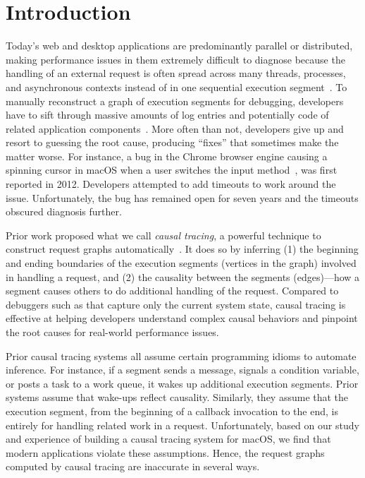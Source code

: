 \section{Introduction} \label{sec:intro}

Today's web and desktop applications are predominantly parallel or
distributed, making performance issues in them extremely difficult to
diagnose because the handling of an external request is often spread across
many threads, processes, and asynchronous contexts instead of in one
sequential execution segment~\cite{harter2012file}. To manually reconstruct
a graph of execution segments for debugging, developers have to sift
through massive amounts of log entries and potentially code of related
application components~\cite{chen2002pinpoint, zhao2016non, xu2009detecting,
nagaraj2012structured, yuan2012conservative}. More often than not, developers
give up and resort to guessing the root cause, producing ``fixes'' that
sometimes make the matter worse. For instance, a bug in the Chrome browser
engine causing a spinning cursor in macOS when a user switches the input
method~\cite{chromiumbugreport}, was first reported in 2012. Developers
attempted to add timeouts to work around the issue. Unfortunately, the bug has
remained open for seven years and the timeouts obscured diagnosis further.

Prior work proposed what we call \emph{causal tracing}, a powerful technique
to construct request graphs automatically~\cite{reynolds2006pip, fonseca2007x,
benjamin2010dapper, zhang2013panappticon, ravindranath2012appinsight}. It
does so by inferring (1) the beginning and ending boundaries of the execution
segments (vertices in the graph) involved in handling a request, and (2) the
causality between the segments (edges)---how a segment causes others to do
additional handling of the request. Compared to debuggers such as \spindump that
capture only the current system state, causal tracing is effective at helping
developers understand complex causal behaviors and pinpoint the root causes
for real-world performance issues.

Prior causal tracing systems all assume certain programming idioms to automate
inference. For instance, if a segment sends a message, signals a condition
variable, or posts a task to a work queue, it wakes up additional execution
segments. Prior systems assume that wake-ups reflect causality. Similarly, they
assume that the execution segment, from the beginning of a callback invocation
to the end, is entirely for handling related work in a request. Unfortunately,
based on our study and experience of building a causal tracing system for macOS,
we find that modern applications violate these assumptions. Hence, the request
graphs computed by causal tracing are inaccurate in several ways.

